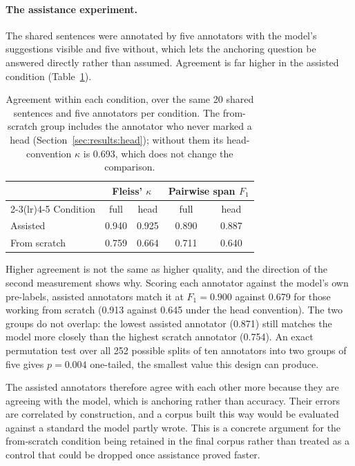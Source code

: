 \paragraph{The assistance experiment.}
The shared sentences were annotated by five annotators with the model's suggestions visible and five without, which lets the anchoring question be answered directly rather than assumed. Agreement is far higher in the assisted condition (Table~\ref{tab:assistance}).

\begin{table}[htbp]
\centering
\caption{Agreement within each condition, over the same 20 shared sentences and five annotators per condition. The from-scratch group includes the annotator who never marked a head (Section~\ref{sec:results:head}); without them its head-convention $\kappa$ is 0.693, which does not change the comparison.}
\label{tab:assistance}
\begin{tabular}{lcccc}
\toprule
& \multicolumn{2}{c}{Fleiss' $\kappa$} & \multicolumn{2}{c}{Pairwise span $F_1$} \\
\cmidrule(lr){2-3}\cmidrule(lr){4-5}
Condition & full & head & full & head \\
\midrule
Assisted & 0.940 & 0.925 & 0.890 & 0.887 \\
From scratch & 0.759 & 0.664 & 0.711 & 0.640 \\
\bottomrule
\end{tabular}
\end{table}

Higher agreement is not the same as higher quality, and the direction of the second measurement shows why. Scoring each annotator against the model's own pre-labels, assisted annotators match it at $F_1 = 0.900$ against 0.679 for those working from scratch (0.913 against 0.645 under the head convention). The two groups do not overlap: the lowest assisted annotator (0.871) still matches the model more closely than the highest scratch annotator (0.754). An exact permutation test over all 252 possible splits of ten annotators into two groups of five gives $p = 0.004$ one-tailed, the smallest value this design can produce.

The assisted annotators therefore agree with each other more because they are agreeing with the model, which is anchoring rather than accuracy. Their errors are correlated by construction, and a corpus built this way would be evaluated against a standard the model partly wrote. This is a concrete argument for the from-scratch condition being retained in the final corpus rather than treated as a control that could be dropped once assistance proved faster.

